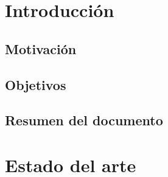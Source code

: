 \documentclass[14pt]{extarticle}
\theoremstyle{definition}
\theoremstyle{remark}
\begin{document}
\section{Introducción}\label{sec:introduccion}
\subsection{Motivación}\label{sec:motivacion}


\subsection{Objetivos}\label{sec:objetivos}
\subsection{Resumen del documento}\label{sec:resumen}
\section{Estado del arte}\label{sec:estadodelarte}
\end{document}
